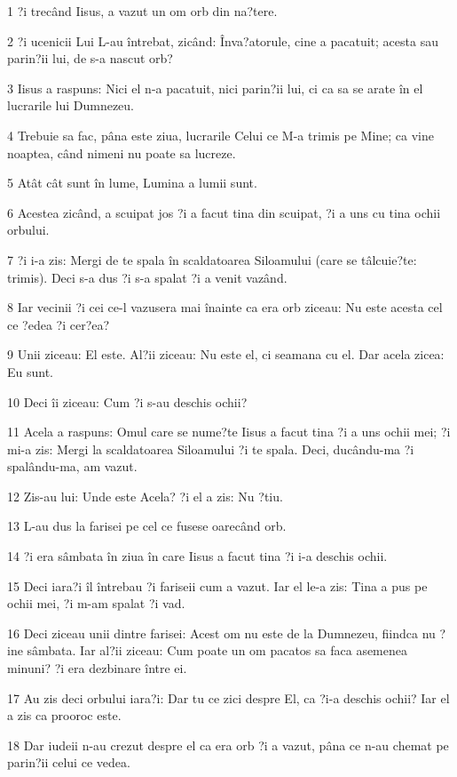 \par 1 ?i trecând Iisus, a vazut un om orb din na?tere.
\par 2 ?i ucenicii Lui L-au întrebat, zicând: Înva?atorule, cine a pacatuit; acesta sau parin?ii lui, de s-a nascut orb?
\par 3 Iisus a raspuns: Nici el n-a pacatuit, nici parin?ii lui, ci ca sa se arate în el lucrarile lui Dumnezeu.
\par 4 Trebuie sa fac, pâna este ziua, lucrarile Celui ce M-a trimis pe Mine; ca vine noaptea, când nimeni nu poate sa lucreze.
\par 5 Atât cât sunt în lume, Lumina a lumii sunt.
\par 6 Acestea zicând, a scuipat jos ?i a facut tina din scuipat, ?i a uns cu tina ochii orbului.
\par 7 ?i i-a zis: Mergi de te spala în scaldatoarea Siloamului (care se tâlcuie?te: trimis). Deci s-a dus ?i s-a spalat ?i a venit vazând.
\par 8 Iar vecinii ?i cei ce-l vazusera mai înainte ca era orb ziceau: Nu este acesta cel ce ?edea ?i cer?ea?
\par 9 Unii ziceau: El este. Al?ii ziceau: Nu este el, ci seamana cu el. Dar acela zicea: Eu sunt.
\par 10 Deci îi ziceau: Cum ?i s-au deschis ochii?
\par 11 Acela a raspuns: Omul care se nume?te Iisus a facut tina ?i a uns ochii mei; ?i mi-a zis: Mergi la scaldatoarea Siloamului ?i te spala. Deci, ducându-ma ?i spalându-ma, am vazut.
\par 12 Zis-au lui: Unde este Acela? ?i el a zis: Nu ?tiu.
\par 13 L-au dus la farisei pe cel ce fusese oarecând orb.
\par 14 ?i era sâmbata în ziua în care Iisus a facut tina ?i i-a deschis ochii.
\par 15 Deci iara?i îl întrebau ?i fariseii cum a vazut. Iar el le-a zis: Tina a pus pe ochii mei, ?i m-am spalat ?i vad.
\par 16 Deci ziceau unii dintre farisei: Acest om nu este de la Dumnezeu, fiindca nu ?ine sâmbata. Iar al?ii ziceau: Cum poate un om pacatos sa faca asemenea minuni? ?i era dezbinare între ei.
\par 17 Au zis deci orbului iara?i: Dar tu ce zici despre El, ca ?i-a deschis ochii? Iar el a zis ca prooroc este.
\par 18 Dar iudeii n-au crezut despre el ca era orb ?i a vazut, pâna ce n-au chemat pe parin?ii celui ce vedea.
